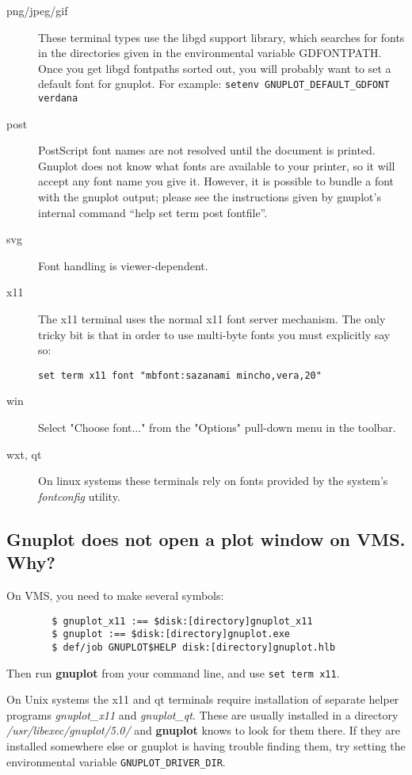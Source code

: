 \documentclass[a4paper,11pt]{article}
\newcommand{\gnuplot}{\textbf{gnuplot }}
\newcommand{\Gnuplot}{\textbf{Gnuplot }}
\begin{document}
\begin{description}
\item [{png/jpeg/gif}] These terminal types use the libgd support library, which
searches for fonts in the directories given in the environmental variable
GDFONTPATH. Once you get libgd fontpaths sorted out, you will probably
want to set a default font for gnuplot.
For example: \verb+setenv GNUPLOT_DEFAULT_GDFONT verdana+
\item [{post}] PostScript font names are not resolved until the document
is printed. Gnuplot does not know what fonts are available to your
printer, so it will accept any font name you give it. However, it
is possible to bundle a font with the gnuplot output; please see the
instructions given by gnuplot's internal command {}``help set term
post fontfile''.
\item [{svg}] Font handling is viewer-dependent. 
\item [{x11}] The x11 terminal uses the normal x11 font server mechanism.
The only tricky bit is that in order to use multi-byte fonts you must
explicitly say so:
\small\begin{verbatim}
set term x11 font "mbfont:sazanami mincho,vera,20"
\end{verbatim}\normalsize
\item [{win}] Select "Choose font..." from the "Options" pull-down menu 
in the toolbar.
\item [{wxt, qt}] On linux systems these terminals rely on fonts provided
by the system's \textit{fontconfig} utility.
\end{description}

\subsection{\Gnuplot{} does not open a plot window on VMS. Why?}
On VMS, you need to make several symbols:

\small
\begin{verbatim}
        $ gnuplot_x11 :== $disk:[directory]gnuplot_x11
        $ gnuplot :== $disk:[directory]gnuplot.exe
        $ def/job GNUPLOT$HELP disk:[directory]gnuplot.hlb
\end{verbatim}
\normalsize

Then run \gnuplot from your command line, and use
\verb+set term x11+.

On Unix systems the x11 and qt terminals require installation of
separate helper programs \textit{gnuplot\_x11} and \textit{gnuplot\_qt}.
These are usually installed in a directory \textit{/usr/libexec/gnuplot/5.0/}
and \gnuplot knows to look for them there.  If they are installed somewhere
else or gnuplot is having trouble finding them, try setting the environmental
variable \verb+GNUPLOT_DRIVER_DIR+.
\end{document}
